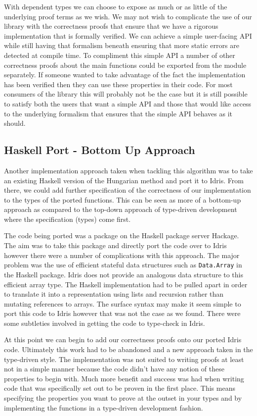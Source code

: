 \documentclass[a4paper, notitlepage]{report}
\begin{document}
With dependent types we can choose to expose as much or as little of the
underlying proof terms as we wish. We may not wish to complicate the use of our
library with the correctness proofs that ensure that we have a rigorous
implementation that is formally verified. We can achieve a simple user-facing
API while still having that formalism beneath ensuring that more static errors
are detected at compile time. To compliment this simple API a number of other
correctness proofs about the main functions could be exported from the module
separately. If someone wanted to take advantage of the fact the implementation
has been verified then they can use these properties in their code. For most
consumers of the library this will probably not be the case but it is still
possible to satisfy both the users that want a simple API and those that would
like access to the underlying formalism that ensures that the simple API behaves
as it should.

\subsection{Haskell Port - Bottom Up Approach}
\label{sec:org43a67db}
Another implementation approach taken when tackling this algorithm was to take
an existing Haskell version of the Hungarian method and port it to Idris. From
there, we could add further specification of the correctness of our
implementation to the types of the ported functions. This can be seen as more of
a bottom-up approach as compared to the top-down approach of type-driven
development where the specification (types) come first.

The code being ported was a package \cite{komuves_munkres_2008} on the Haskell
package server Hackage. The aim was to take this package and directly port the
code over to Idris however there were a number of complications with this
approach. The major problem was the use of efficient stateful data structures
such as \texttt{Data.Array} in the Haskell package. Idris does not provide an analogous
data structure to this efficient array type. The Haskell implementation had to
be pulled apart in order to translate it into a representation using lists and
recursion rather than mutating references to arrays. The surface syntax may make
it seem simple to port this code to Idris however that was not the case as we
found. There were some subtleties involved in getting the code to type-check in
Idris.

At this point we can begin to add our correctness proofs onto our ported Idris
code. Ultimately this work had to be abandoned and a new approach taken in the
type-driven style. The implementation was not suited to writing proofs at least
not in a simple manner because the code didn't have any notion of these
properties to begin with. Much more benefit and success was had when writing
code that was specifically set out to be proven in the first place. This means
specifying the properties you want to prove at the outset in your types and by
implementing the functions in a type-driven development fashion.
\end{document}
